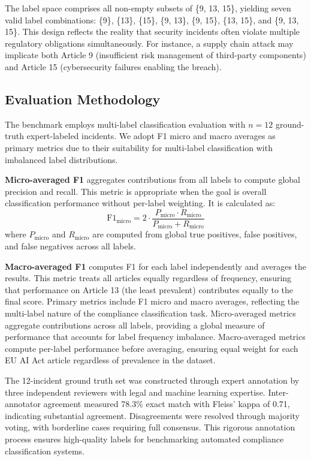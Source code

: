 \documentclass[10pt,conference]{IEEEtran}
\begin{document}
The label space comprises all non-empty subsets of \{9, 13, 15\}, yielding seven valid label combinations: \{9\}, \{13\}, \{15\}, \{9, 13\}, \{9, 15\}, \{13, 15\}, and \{9, 13, 15\}. This design reflects the reality that security incidents often violate multiple regulatory obligations simultaneously. For instance, a supply chain attack may implicate both Article 9 (insufficient risk management of third-party components) and Article 15 (cybersecurity failures enabling the breach).

\subsection{Evaluation Methodology}

The benchmark employs multi-label classification evaluation with $n=12$ ground-truth expert-labeled incidents. We adopt F1 micro and macro averages as primary metrics due to their suitability for multi-label classification with imbalanced label distributions.

\textbf{Micro-averaged F1} aggregates contributions from all labels to compute global precision and recall. This metric is appropriate when the goal is overall classification performance without per-label weighting. It is calculated as:
\begin{equation}
\text{F1}_{\text{micro}} = 2 \cdot \frac{P_{\text{micro}} \cdot R_{\text{micro}}}{P_{\text{micro}} + R_{\text{micro}}}
\end{equation}
where $P_{\text{micro}}$ and $R_{\text{micro}}$ are computed from global true positives, false positives, and false negatives across all labels.

\textbf{Macro-averaged F1} computes F1 for each label independently and averages the results. This metric treats all articles equally regardless of frequency, ensuring that performance on Article 13 (the least prevalent) contributes equally to the final score. Primary metrics include F1 micro and macro averages, reflecting the multi-label nature of the compliance classification task. Micro-averaged metrics aggregate contributions across all labels, providing a global measure of performance that accounts for label frequency imbalance. Macro-averaged metrics compute per-label performance before averaging, ensuring equal weight for each EU AI Act article regardless of prevalence in the dataset.

The 12-incident ground truth set was constructed through expert annotation by three independent reviewers with legal and machine learning expertise. Inter-annotator agreement measured 78.3\% exact match with Fleiss' kappa of 0.71, indicating substantial agreement. Disagreements were resolved through majority voting, with borderline cases requiring full consensus. This rigorous annotation process ensures high-quality labels for benchmarking automated compliance classification systems.
\end{document}
